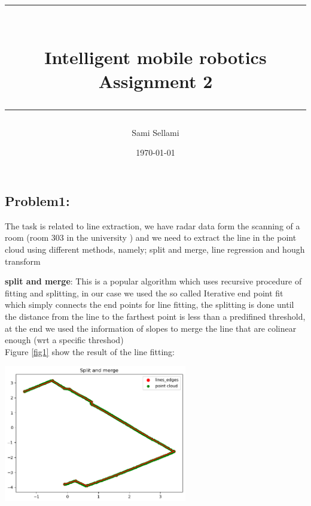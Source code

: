 \documentclass[11pt,a4paper]{report}
\title{
\rule{15cm}{1pt} \\
\Large {\bfseries Intelligent mobile robotics} \\
\Large {\bfseries Assignment 2}\\
\rule{15cm}{1pt}}
\author{Sami Sellami}
\date{\today}
\begin{document}
\setcounter{page}{1}
\setcounter{secnumdepth}{1}
	
\selectfont

\maketitle

\titlelabel{\thetitle)\quad}
\titlespacing{\chapter}{0cm}{0cm}{0cm}
\titlespacing{\section}{0.2cm}{0cm}{0cm}

\subsection{\textbf{Problem1:}}

The task is related to line extraction, we have radar data form the scanning of a room (room 303 in the university ) and we need to extract the line in the point cloud using different methods, namely; split and merge, line regression and hough transform
 
 \textbf{split and merge}:
This is a popular algorithm which uses recursive procedure of fitting and splitting, in our case we used the so called Iterative end point fit which simply connects the end points for line fitting, the splitting is done until the distance from the line to the farthest point is less than a predifined threshold, at the end we used the information of slopes to merge the line that are colinear enough (wrt a specific threshod) \\
Figure \ref{fig1} show the result of the line fitting:

\begin{center}\label{fig1}
	\includegraphics[width=8cm]{Capture1.png}
\end{center}
\end{document}
